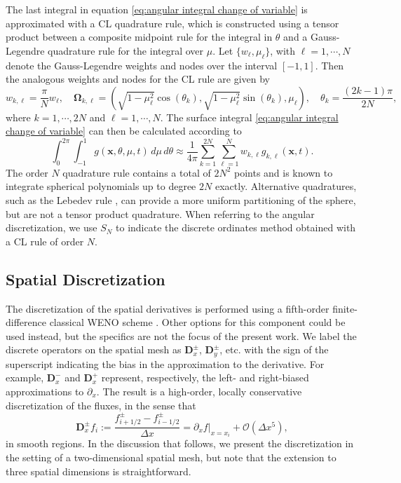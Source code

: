 \documentclass[onefignum,onetabnum]{siamart220329}
\begin{document}
The last integral in equation \eqref{eq:angular integral change of variable} is approximated with a CL quadrature rule, which is constructed using a tensor product between a composite midpoint rule for the integral in $\theta$ and a Gauss-Legendre quadrature rule for the integral over $\mu$. Let $\{w_{\ell}, \mu_{\ell} \}$, with $\ell = 1, \cdots, N$ denote the Gauss-Legendre weights and nodes over the interval $[-1,1]$. Then the analogous weights and nodes for the CL rule are given by
\begin{equation*}
    w_{k,\ell} = \frac{\pi}{N} w_{\ell}, \quad \mathbf{\Omega}_{k,\ell} = \left( \sqrt{1 - \mu_{\ell}^{2}} \cos (\theta_{k}), \sqrt{1 - \mu_{\ell}^{2}} \sin (\theta_{k}), \mu_{\ell} \right), \quad \theta_{k} = \frac{(2k - 1)\pi}{2N},
\end{equation*}
where $k = 1, \cdots, 2N$ and $\ell = 1, \cdots, N.$
The surface integral \eqref{eq:angular integral change of variable} can then be calculated according to
\begin{equation*}
    \int_{0}^{2\pi} \int_{-1}^{1}  g (\mathbf{x}, \theta, \mu, t) \,d\mu \,d\theta \approx \frac{1}{4\pi} \sum_{k = 1}^{2N} \sum_{\ell = 1}^{N} w_{k,\ell} g_{k,\ell} (\mathbf{x}, t).
\end{equation*}
The order $N$ quadrature rule contains a total of $2N^{2}$ points and is known to integrate spherical polynomials up to degree $2N$ exactly. Alternative quadratures, such as the Lebedev rule \cite{Lebedev1976}, can provide a more uniform partitioning of the sphere, but are not a tensor product quadrature. When referring to the angular discretization, we use $S_{N}$ to indicate the discrete ordinates method obtained with a CL rule of order $N$.

\subsection{Spatial Discretization}
\label{subsec:spatial discretization}

The discretization of the spatial derivatives is performed using a fifth-order finite-difference classical WENO scheme \cite{shu2009high}. Other options for this component could be used instead, but the specifics are not the focus of the present work. We label the discrete operators on the spatial mesh as $\mathbf{D}_{x}^{\pm}$, $\mathbf{D}_{y}^{\pm}$, etc. with the sign of the superscript indicating the bias in the approximation to the derivative. For example, $\mathbf{D}_{x}^{-}$ and $\mathbf{D}_{x}^{+}$ represent, respectively, the left- and right-biased approximations to $\partial_{x}$. The result is a high-order, locally conservative discretization of the fluxes, in the sense that
\begin{equation*}
    \mathbf{D}_{x}^{\pm} f_{i} := \frac{f_{i+1/2}^{\pm} - f_{i-1/2}^{\pm}}{\Delta x} = \partial_{x} f \Big\rvert_{x = x_{i}} + \mathcal{O}\left( \Delta x^{5} \right),
\end{equation*}
in smooth regions. In the discussion that follows, we present the discretization in the setting of a two-dimensional spatial mesh, but note that the extension to three spatial dimensions is straightforward.
\end{document}
